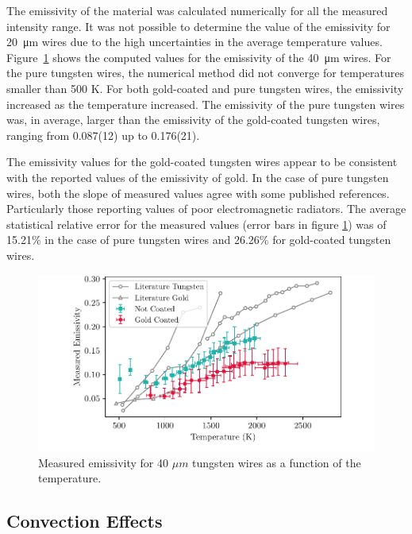 The emissivity of the material was calculated numerically for all the measured intensity range. It was not possible to determine the value of the emissivity for \SI{20}{\micro \metre} wires due to the high uncertainties in the average temperature values. Figure~\ref{fig:EmissivityCalculations} shows the computed values for the emissivity of the \SI{40}{\micro \metre} wires. For the pure tungsten wires, the numerical method did not converge for temperatures smaller than 500 K. For both gold-coated and pure tungsten wires, the emissivity increased as the temperature increased. The emissivity of the pure tungsten wires was, in average, larger than the emissivity of the gold-coated tungsten wires, ranging from 0.087(12) up to 0.176(21). 

The emissivity values for the gold-coated tungsten wires appear to be consistent with the reported values of the emissivity of gold. In the case of pure tungsten wires, both the slope of measured values agree with some published references. Particularly those reporting values of poor electromagnetic radiators. The average statistical relative error for the measured values (error bars in figure \ref{fig:EmissivityCalculations}) was of 15.21$\%$ in the case of pure tungsten wires and 26.26$\%$ for gold-coated tungsten wires. 

\begin{figure}[h]
    \centering
    \includegraphics[width=\columnwidth]{EmissivitySummary/EmissivitySummaryPlot.pdf}
    \caption{Measured emissivity for 40 $\mu m$ tungsten wires as a function of the temperature.}
    \label{fig:EmissivityCalculations}
\end{figure}

\subsection{Convection Effects}

